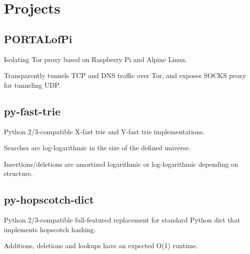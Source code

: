 \documentclass[]{deedy-resume-openfont}
\begin{document}
\begin{minipage}[t]{0.64\textwidth}

\section{Projects}
\subsection{PORTALofPi}
\vspace{\topsep} %
\begin{tightemize}
\item Isolating Tor proxy based on Raspberry Pi and Alpine Linux.
\item Transparently tunnels TCP and DNS traffic over Tor, and exposes SOCKS proxy for tunneling UDP.
\end{tightemize}
\sectionsep

\subsection{py-fast-trie}
\vspace{\topsep} %
\begin{tightemize}
\item Python 2/3-compatible X-fast trie and Y-fast trie implementations.
\item Searches are log-logarithmic in the size of the defined universe.
\item Insertions/deletions are amortized logarithmic or log-logarithmic depending on structure.
\end{tightemize}
\sectionsep

\subsection{py-hopscotch-dict}
\vspace{\topsep} %
\begin{tightemize}
\item Python 2/3-compatible full-featured replacement for standard Python dict that implements hopscotch hashing.
\item Additions, deletions and lookups have an expected O(1) runtime.
\end{tightemize}
\sectionsep

%

\end{minipage}
\end{document}
